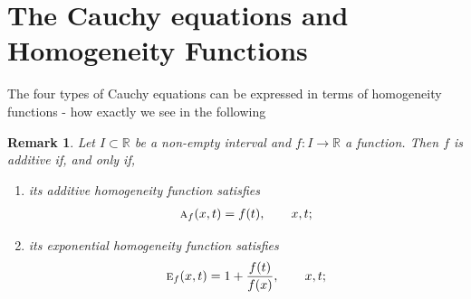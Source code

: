 \documentclass{amsart}
\theoremstyle{plain}
\newtheorem{remark}{Remark}
\numberwithin{equation}{section}
\newcommand{\eh}{\textsc{e}}
\newcommand{\R}{{\mathbb{R}}}
\begin{document}
\section{The Cauchy equations and Homogeneity Functions}
The four types of Cauchy equations
can be expressed in terms of homogeneity functions -
how exactly we see in the following


\begin{remark}
Let $I \subset \R$ be a non-empty interval and $f: I \to \R$ a function.
Then $f$ is additive if, and only if,
\begin{enumerate}
    \item 
its additive homogeneity function satisfies
\begin{align*}
\textsc{a}_f (x,t) = f(t), \qquad x,t;   
\end{align*}

\item 
its exponential homogeneity function satisfies
\begin{align*}
\eh_f (x,t) = 1+ \frac{f(t)}{f(x)}, \qquad x,t;   
\end{align*}
\end{enumerate}
\end{remark}
\end{document}
